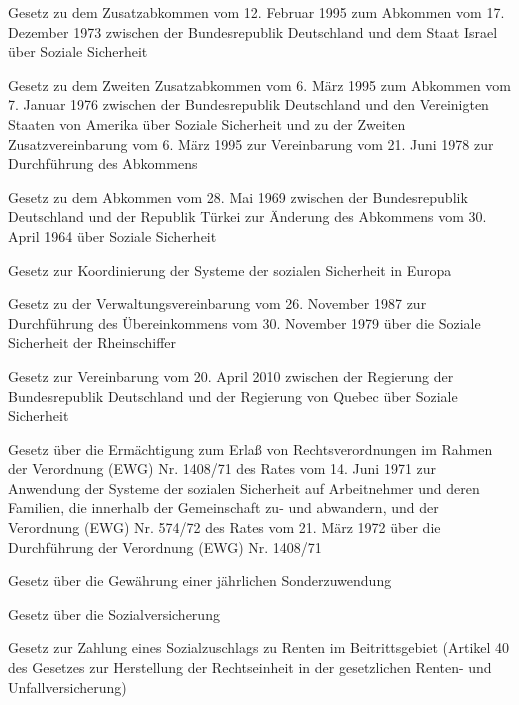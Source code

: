 \item[{SozSichAbkZusAbkISRG}] Gesetz zu dem Zusatzabkommen vom 12. Februar 1995 zum Abkommen vom 17. Dezember 1973 zwischen der Bundesrepublik Deutschland und dem Staat Israel über Soziale Sicherheit

\item[{SozSichAbkZusAbkZVbg-2USAG}] Gesetz zu dem Zweiten Zusatzabkommen vom 6. März 1995 zum Abkommen vom 7. Januar 1976 zwischen der Bundesrepublik Deutschland und den Vereinigten Staaten von Amerika über Soziale Sicherheit und zu der Zweiten Zusatzvereinbarung vom 6. März 1995 zur Vereinbarung vom 21. Juni 1978 zur Durchführung des Abkommens

\item[{SozSichÄndAbkTURG}] Gesetz zu dem Abkommen vom 28. Mai 1969 zwischen der Bundesrepublik Deutschland und der Republik Türkei zur Änderung des Abkommens vom 30. April 1964 über Soziale Sicherheit

\item[{SozSichEUG}] Gesetz zur Koordinierung der Systeme der sozialen Sicherheit in Europa

\item[{SozSichRheinSchiffÜbkVwVbgG}] Gesetz zu der Verwaltungsvereinbarung vom 26. November 1987 zur Durchführung des Übereinkommens vom 30. November 1979 über die Soziale Sicherheit der Rheinschiffer

\item[{SozSichVbgCANG}] Gesetz zur Vereinbarung vom 20. April 2010 zwischen der Regierung der Bundesrepublik Deutschland und der Regierung von Quebec über Soziale Sicherheit

\item[{SozSichWArbnErmG}] Gesetz über die Ermächtigung zum Erlaß von Rechtsverordnungen im Rahmen der Verordnung (EWG) Nr. 1408/71 des Rates vom 14. Juni 1971 zur Anwendung der Systeme der sozialen Sicherheit auf Arbeitnehmer und deren Familien, die innerhalb der Gemeinschaft zu- und abwandern, und der Verordnung (EWG) Nr. 574/72 des Rates vom 21. März 1972 über die Durchführung der Verordnung (EWG) Nr. 1408/71

\item[{SoZuwG}] Gesetz über die Gewährung einer jährlichen Sonderzuwendung

\item[{SozVersG}] Gesetz über die Sozialversicherung

\item[{SozZuschlG}] Gesetz zur Zahlung eines Sozialzuschlags zu Renten im Beitrittsgebiet (Artikel 40 des Gesetzes zur Herstellung der Rechtseinheit in der gesetzlichen Renten- und Unfallversicherung)

